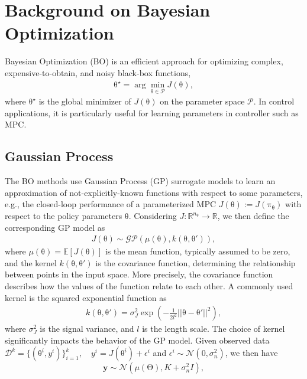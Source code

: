\documentclass[10pt,twocolumn,twoside]{IEEEtran}
\newcommand{\vect}[1]{\ensuremath{\boldsymbol{\mathrm{#1}}}}
\begin{document}
\section{Background on Bayesian Optimization}\label{sec:3}
Bayesian Optimization (BO) is an efficient approach for optimizing complex, expensive-to-obtain, and noisy black-box functions,
\begin{align}
   \vect{\theta}^\star = \arg \min_{\vect{\theta}\in\mathcal{P}} J(\vect{\theta}), 
\end{align}
where $\vect\theta^\star$ is the global minimizer of $J(\vect{\theta})$ on the parameter space $\mathcal{P}$. In control applications, it is particularly useful for learning parameters in controller such as MPC.
\subsection{Gaussian Process}
The BO methods use Gaussian Process (GP) surrogate models to learn an approximation of not-explicitly-known functions with respect to some parameters, e.g., the closed-loop performance of a parameterized MPC $J\left(\vect\theta\right):=J\left(\vect\pi_{\vect\theta}\right)$ with respect to the policy parameters $\vect\theta$. Considering \( J: \mathbb{R}^{n_{\vect\theta}} \rightarrow \mathbb{R} \), we then define the corresponding GP model as
\begin{align}\label{eq:GP}
  J(\vect\theta) \sim \mathcal{GP}(\mu(\vect\theta), k(\vect\theta, \vect\theta')),
\end{align}
where $\mu(\vect{\theta}) = \mathbb{E}[J(\vect{\theta})]$ is the mean function, typically assumed to be zero, and the kernel $k(\vect \theta, \vect \theta')$ is the covariance function, determining the relationship between points in the input space. More precisely, the covariance function describes how the values of the function relate to each other. A commonly used kernel is the squared exponential function as
\begin{align}
    k(\vect{\theta}, \vect{\theta'}) = \sigma_J^2 \exp\left(-\frac{1}{2l^2} ||\vect{\theta} - \vect{\theta'}||^2\right),
\end{align}
where $\sigma_J^2$ is the signal variance, and $l$ is the length scale. The choice of kernel significantly impacts the behavior of the GP model. Given observed data \(\mathcal{D}^k = \{(\vect{\theta}^i, y^i)\}_{i=1}^k,\quad y^i = J(\vect{\theta}^i) + \epsilon^i\) and \(\epsilon^i \sim \mathcal{N}(0, \sigma_n^2)\), we then have
\[
\mathbf{y} \sim \mathcal{N}(\mu(\vect{\Theta}), K + \sigma_n^2 I),
\]
\end{document}
